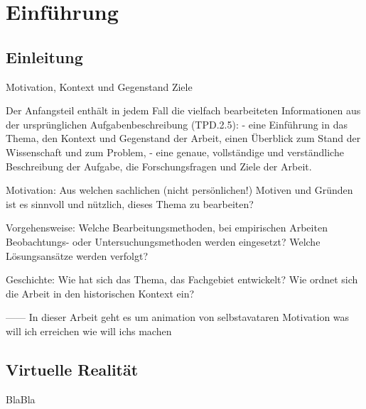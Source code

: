 \chapter{Einführung}

\section{Einleitung}
Motivation, Kontext und Gegenstand
Ziele

Der Anfangsteil enthält in jedem Fall die vielfach bearbeiteten Informationen aus der
ursprünglichen Aufgabenbeschreibung (TPD.2.5):
- eine Einführung in das Thema, den Kontext und Gegenstand der Arbeit, einen
Überblick zum Stand der Wissenschaft und zum Problem,
- eine genaue, vollständige und verständliche Beschreibung der Aufgabe, die Forschungsfragen und Ziele der Arbeit.

Motivation: Aus welchen sachlichen (nicht persönlichen!) Motiven und Gründen ist es
sinnvoll und nützlich, dieses Thema zu bearbeiten?

Vorgehensweise: Welche Bearbeitungsmethoden, bei empirischen Arbeiten Beobachtungs- oder Untersuchungsmethoden werden eingesetzt? Welche Lösungsansätze werden verfolgt?

Geschichte: Wie hat sich das Thema, das Fachgebiet entwickelt? Wie ordnet sich die
Arbeit in den historischen Kontext ein?

------
In dieser Arbeit geht es um animation von selbstavataren
Motivation
was will ich erreichen
wie will ichs machen

\section{Virtuelle Realität}
BlaBla\cite{Dummer2009}

